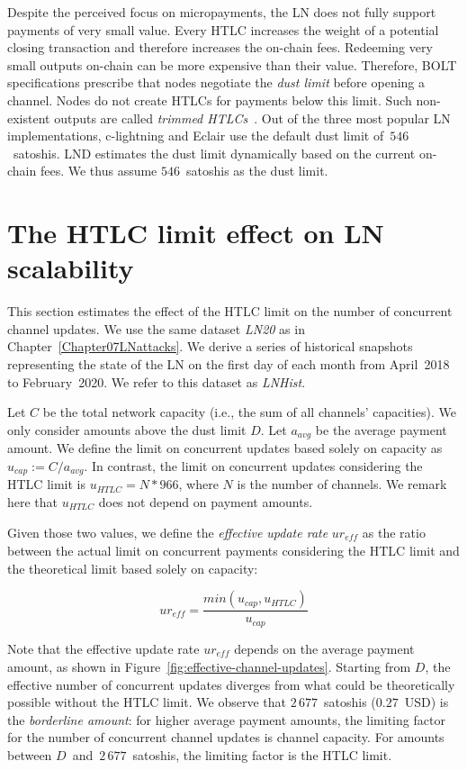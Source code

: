 Despite the perceived focus on micropayments, the LN does not fully support payments of very small value.
Every HTLC increases the weight of a potential closing transaction and therefore increases the on-chain fees.
Redeeming very small outputs on-chain can be more expensive than their value.
Therefore, BOLT specifications prescribe that nodes negotiate the \textit{dust limit} before opening a channel.
Nodes do not create HTLCs for payments below this limit.
Such non-existent outputs are called \textit{trimmed HTLCs}~\cite{BOLT3Trimmed}.
Out of the three most popular LN implementations, c-lightning and Eclair use the default dust limit of~$546$~satoshis.
LND estimates the dust limit dynamically based on the current on-chain fees.
We thus assume $546$~satoshis as the dust limit.


\section{The HTLC limit effect on LN scalability}

This section estimates the effect of the HTLC limit on the number of concurrent channel updates.
We use the same dataset \textit{LN20} as in Chapter~\ref{Chapter07LNattacks}.
We derive a series of historical snapshots representing the state of the LN on the first day of each month from April~2018 to February~2020.
We refer to this dataset as \textit{LNHist}.

Let $C$ be the total network capacity (i.e., the sum of all channels' capacities).
We only consider amounts above the dust limit $D$.
Let $a_\textit{avg}$ be the average payment amount.
We define the limit on concurrent updates based solely on capacity as $u_\textit{cap} := C / a_\textit{avg}$.
In contrast, the limit on concurrent updates considering the HTLC limit is $u_\textit{HTLC} = N * 966$, where $N$ is the number of channels.
We remark here that $u_\textit{HTLC}$ does not depend on payment amounts.

Given those two values, we define the \textit{effective update rate} $ur_\textit{eff}$ as the ratio between the actual limit on concurrent payments considering the HTLC limit and the theoretical limit based solely on capacity:

\[ur_\textit{eff} = \frac{min(u_\textit{cap}, u_\textit{HTLC})}{u_\textit{cap}}\]

Note that the effective update rate $ur_\textit{eff}$ depends on the average payment amount, as shown in Figure~\ref{fig:effective-channel-updates}.
Starting from $D$, the effective number of concurrent updates diverges from what could be theoretically possible without the HTLC limit.
We observe that $2\,677$~satoshis ($0.27$~USD) is the \textit{borderline amount}: for higher average payment amounts, the limiting factor for the number of concurrent channel updates is channel capacity.
For amounts between $D$~and~$2\,677$~satoshis, the limiting factor is the HTLC limit.

